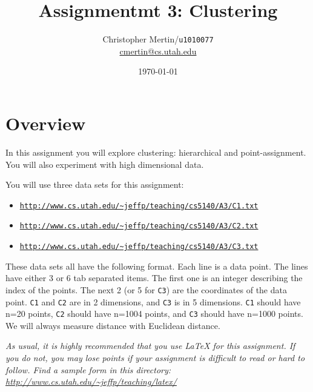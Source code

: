 \documentclass[11pt]{article}
\title{Assignmentmt 3: Clustering}
\author{Christopher Mertin/\verb~u1010077~\\\url{cmertin@cs.utah.edu}}
\date{\today}
\begin{document}
\maketitle




\section*{Overview}

In this assignment you will explore clustering: hierarchical and point-assignment.  
You will also experiment with high dimensional data.  

You will use three data sets for this assignment:
\begin{itemize} \denselist
\item \href{http://www.cs.utah.edu/~jeffp/teaching/cs5140/A3/C1.txt}{\texttt{http://www.cs.utah.edu/\~{}jeffp/teaching/cs5140/A3/C1.txt}}
\item \href{http://www.cs.utah.edu/~jeffp/teaching/cs5140/A3/C2.txt}{\texttt{http://www.cs.utah.edu/\~{}jeffp/teaching/cs5140/A3/C2.txt}}
\item \href{http://www.cs.utah.edu/~jeffp/teaching/cs5140/A3/C3.txt}{\texttt{http://www.cs.utah.edu/\~{}jeffp/teaching/cs5140/A3/C3.txt}}
\end{itemize}
These data sets all have the following format.  Each line is a data point.  The lines have either 3 or 6 tab separated items.  The first one is an integer describing the index of the points.  The next 2 (or 5 for \texttt{C3}) are the coordinates of the data point.  \texttt{C1} and \texttt{C2} are in 2 dimensions, and \texttt{C3} is in 5 dimensions.  \texttt{C1} should have n=20 points, \texttt{C2} should have n=1004 points, and \texttt{C3} should have n=1000 points.  
We will always measure distance with Euclidean distance.  


\vspace{.1in}

\emph{As usual, it is highly recommended that you use LaTeX for this assignment.  If you do not, you may lose points if your assignment is difficult to read or hard to follow.  Find a sample form in this directory:
\url{http://www.cs.utah.edu/~jeffp/teaching/latex/}}


\end{document}
